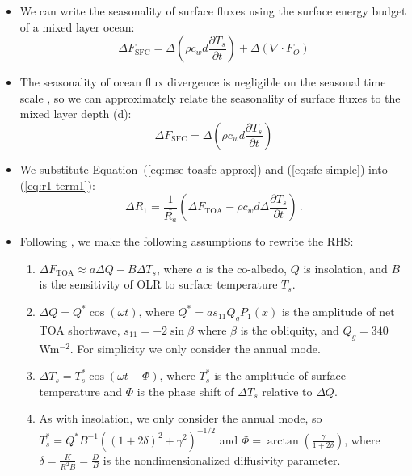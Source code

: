 \documentclass{ametsocV5}
\begin{document}
\begin{itemize}
  \item We can write the seasonality of surface fluxes using the surface energy budget of a mixed layer ocean:
        \begin{equation}
          \Delta F_{\mathrm{SFC}} = \Delta\left(\rho c_{w} d \frac{\partial T_{s}}{\partial t}\right) + \Delta ( \nabla\cdot F_{O})
        \end{equation}
  \item The seasonality of ocean flux divergence is negligible on the seasonal time scale \citep{roberts2017}, so we can approximately relate the seasonality of surface fluxes to the mixed layer depth (d):
        \begin{equation} \label{eq:sfc-simple}
          \Delta F_{\mathrm{SFC}} = \Delta\left(\rho c_{w} d \frac{\partial T_{s}}{\partial t}\right)
        \end{equation}
  \item We substitute Equation~(\ref{eq:mse-toasfc-approx}) and (\ref{eq:sfc-simple}) into (\ref{eq:r1-term1}):
        \begin{equation} \label{eq:r1-linear2}
          \Delta R_{1} = \frac{1}{\overline{R_{a}}}\left(\Delta F_{\mathrm{TOA}}-\rho c_{w} d \Delta\frac{\partial T_{s}}{\partial t}\right) \, .
        \end{equation}
  \item Following \cite{rose2017}, we make the following assumptions to rewrite the RHS:
        \begin{enumerate}
          \item $\Delta F_{\mathrm{TOA}} \approx a\Delta Q - B\Delta T_{s}$, where $a$ is the co-albedo, $Q$ is insolation, and $B$ is the sensitivity of OLR to surface temperature $T_{s}$.
          \item $\Delta Q = Q^{*}\cos(\omega t)$, where $Q^{*}=as_{11}Q_{g}P_{1}(x)$ is the amplitude of net TOA shortwave, $s_{11}=-2\sin{\beta}$ where $\beta$ is the obliquity, and $Q_{g}=340$ Wm$^{-2}$. For simplicity we only consider the annual mode.
          \item $\Delta T_{s} = T_{s}^{*}\cos(\omega t - \Phi)$, where $T_{s}^{*}$ is the amplitude of surface temperature and $\Phi$ is the phase shift of $\Delta T_{s}$ relative to $\Delta Q$.
          \item As with insolation, we only consider the annual mode, so $T_{s}^{*}=Q^{*}B^{-1}\left((1+2\delta)^{2}+\gamma^{2}\right)^{-1/2}$ and $\Phi=\arctan\left(\frac{\gamma}{1+2\delta}\right)$, where $\delta = \frac{K}{R^2 B}  = \frac{D}{B}$ is the nondimensionalized diffusivity parameter.

\end{enumerate}
\end{itemize}
\end{document}
